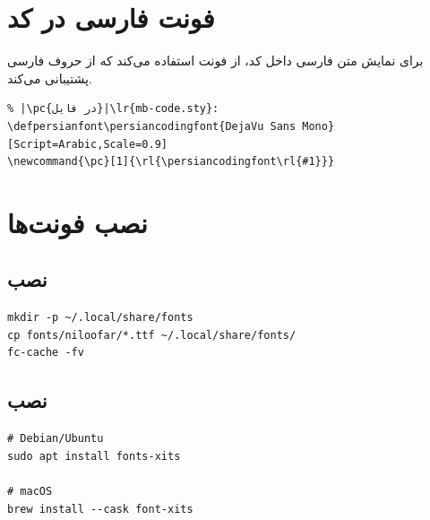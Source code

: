 
\section{فونت فارسی در کد}
\label{sec:fonts-persian-code}

برای نمایش متن فارسی داخل کد، 
از فونت  استفاده می‌کند
که از حروف فارسی پشتیبانی می‌کند.

\begin{latin}
\begin{verbatim}
% |\pc{در فایل}|\lr{mb-code.sty}:
\defpersianfont\persiancodingfont{DejaVu Sans Mono}[Script=Arabic,Scale=0.9]
\newcommand{\pc}[1]{\rl{\persiancodingfont\rl{#1}}}
\end{verbatim}
\end{latin}


\section{نصب فونت‌ها}
\label{sec:fonts-installation}

\subsection{نصب }
\label{sec:fonts-install-niloofar}

\begin{latin}
\begin{verbatim}
mkdir -p ~/.local/share/fonts
cp fonts/niloofar/*.ttf ~/.local/share/fonts/
fc-cache -fv
\end{verbatim}
\end{latin}

\subsection{نصب }
\label{sec:fonts-install-xits}

\begin{latin}
\begin{verbatim}
# Debian/Ubuntu
sudo apt install fonts-xits

# macOS
brew install --cask font-xits
\end{verbatim}
\end{latin}

